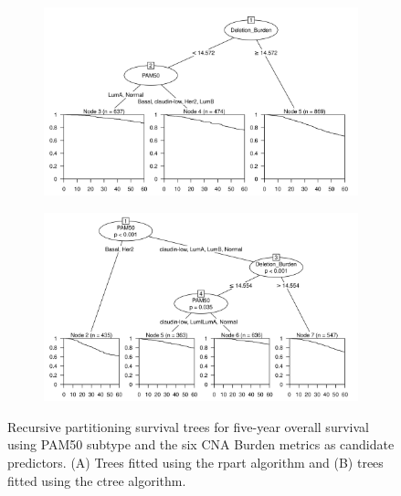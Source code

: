 \begin{figure}[!htb]
\centering

\vspace{0.5cm}

\begin{subfigure}{\textwidth}
\subcaption{}
\includegraphics[width=1\textwidth]{../figures/Appendices/Appendix_B/PartyKit_Survival_Burden_FiveYearOS_PAM50.png}
\end{subfigure}

\vspace{2cm}

\begin{subfigure}{\textwidth}
\subcaption{}
\includegraphics[width=1\textwidth]{../figures/Appendices/Appendix_B/Ctree_Survival_Burden_FiveYearOS_PAM50.png}
\end{subfigure}

\vspace{0.5cm}

\caption[Recursive partitioning survival trees for five-year overall survival using PAM50 subtype and the six CNA Burden metrics as candidate predictors.]{Recursive partitioning survival trees for five-year overall survival using PAM50 subtype and the six CNA Burden metrics as candidate predictors. (A) Trees fitted using the rpart algorithm and (B) trees fitted using the ctree algorithm.}
\end{figure}

